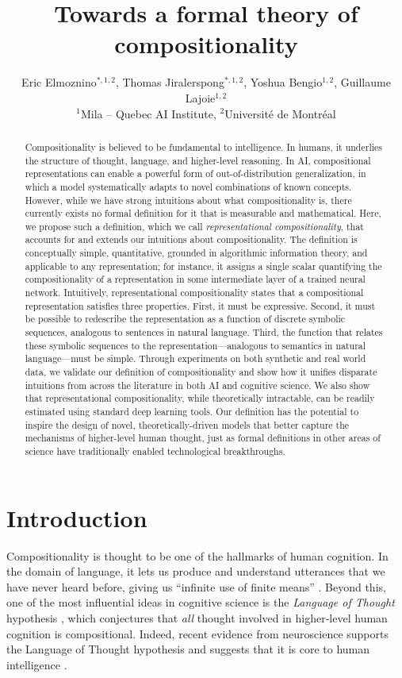 \documentclass{article} %
\title{Towards a formal theory of compositionality}
\author{
    Eric Elmoznino$^{*,1,2}$, 
    Thomas Jiralerspong$^{*,1,2}$,
    Yoshua Bengio$^{1,2}$,
    Guillaume Lajoie$^{1,2}$  \\
    $^1$Mila -- Quebec AI Institute, 
    $^2$Universit\'e de Montr\'eal
    \vphantom{
    \thanks{Equal contribution. Correspondence to: \texttt{\{eric.elmoznino,guillaume.lajoie\}@mila.quebec}.}
    }
}
\newcommand{\comp}{representational compositionality}
\begin{document}
\maketitle

\begin{abstract}
Compositionality is believed to be fundamental to intelligence. In humans, it underlies the structure of thought, language, and higher-level reasoning. In AI, compositional representations can enable a powerful form of out-of-distribution generalization, in which a model systematically adapts to novel combinations of known concepts. However, while we have strong intuitions about what compositionality is, there currently exists no formal definition for it that is measurable and mathematical. Here, we propose such a definition, which we call \textit{\comp{}}, that accounts for and extends our intuitions about compositionality. The definition is conceptually simple, quantitative, grounded in algorithmic information theory, and applicable to any representation; for instance, it assigns a single scalar quantifying the compositionality of a representation in some intermediate layer of a trained neural network. Intuitively, \comp{} states that a compositional representation satisfies three properties. First, it must be expressive. Second, it must be possible to redescribe the representation as a function of discrete symbolic sequences, analogous to sentences in natural language. Third, the function that relates these symbolic sequences to the representation---analogous to semantics in natural language---must be simple. Through experiments on both synthetic and real world data, we validate our definition of compositionality and show how it unifies disparate intuitions from across the literature in both AI and cognitive science. We also show that \comp{}, while theoretically intractable, can be readily estimated using standard deep learning tools. Our definition has the potential to inspire the design of novel, theoretically-driven models that better capture the mechanisms of higher-level human thought, just as formal definitions in other areas of science have traditionally enabled technological breakthroughs.
\end{abstract}


\section{Introduction}

Compositionality is thought to be one of the hallmarks of human cognition. In the domain of language, it lets us produce and understand utterances that we have never heard before, giving us ``infinite use of finite means'' \citep{chomsky1956three}. Beyond this, one of the most influential ideas in cognitive science is the \textit{Language of Thought} hypothesis \citep{fodor1975language,quilty2023best}, which conjectures that \emph{all} thought involved in higher-level human cognition is compositional. Indeed, recent evidence from neuroscience supports the Language of Thought hypothesis and suggests that it is core to human intelligence \citep{dehaene_symbols_2022}.
\end{document}
